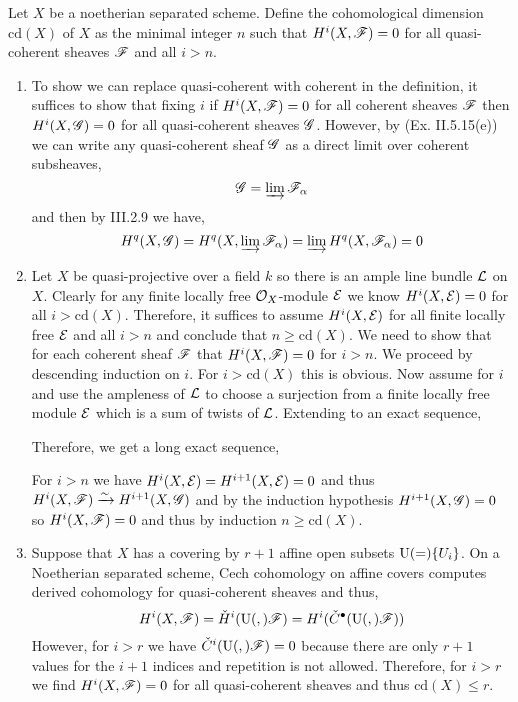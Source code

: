 \documentclass[12pt]{article}
\begin{document}
\newcommand{\cd}[1]{\mathrm{cd}\left( #1 \right)}

Let $X$ be a noetherian separated scheme. Define the cohomological dimension $\cd{X}$ of $X$ as the minimal integer $n$ such that $H^i(X, \mathscr{F}) = 0$ for all quasi-coherent sheaves $\mathscr{F}$ and all $i  > n$. 

\begin{enumerate}
\item To show we can replace quasi-coherent with coherent in the definition, it suffices to show that fixing $i$ if $H^i(X, \mathscr{F}) = 0$ for all coherent sheaves $\mathscr{F}$ then $H^i(X, \mathscr{G}) = 0$ for all quasi-coherent sheaves $\mathscr{G}$. However, by (Ex. II.5.15(e)) we can write any quasi-coherent sheaf $\mathscr{G}$ as a direct limit over coherent subsheaves,
\[ \mathscr{G} = \varinjlim \mathscr{F}_\alpha \]
and then by III.2.9 we have,
\[ H^q(X, \mathscr{G}) = H^q(X, \varinjlim \mathscr{F}_\alpha) = \varinjlim H^q(X, \mathscr{F}_\alpha) = 0 \]

\item Let $X$ be quasi-projective over a field $k$ so there is an ample line bundle $\mathcal{L}$ on $X$. Clearly for any finite locally free $\mathcal{O}_{X}$-module $\mathcal{E}$ we know $H^i(X, \mathcal{E}) = 0$ for all $i > \cd{X}$. Therefore, it suffices to assume $H^i(X, \mathcal{E})$ for all finite locally free $\mathcal{E}$ and all $i > n$ and conclude that $n \ge \cd{X}$. We need to show that for each coherent sheaf $\mathscr{F}$ that $H^i(X, \mathscr{F}) = 0$ for $i > n$. We proceed by descending induction on $i$. For $i > \cd{X}$ this is obvious. Now assume for $i$ and use the ampleness of $\mathcal{L}$ to choose a surjection from a finite locally free module $\mathcal{E}$ which is a sum of twists of $\mathcal{L}$. Extending to an exact sequence,
\begin{center}
\end{center}
Therefore, we get a long exact sequence,
\begin{center}
\end{center}
For $i > n$ we have $H^i(X, \mathcal{E}) = H^{i+1}(X, \mathcal{E}) = 0$ and thus $H^i(X, \mathscr{F}) \xrightarrow{\sim} H^{i+1}(X, \mathscr{G})$ and by the induction hypothesis $H^{i+1}(X, \mathscr{G}) = 0$ so $H^i(X, \mathscr{F}) = 0$ and thus by induction $n \ge \cd{X}$.
 
\item Suppose that $X$ has a covering by $r+1$ affine open subsets $\mathrm{U}(=) \{ U_i \}$. On a Noetherian separated scheme, Cech cohomology on affine covers computes derived cohomology for quasi-coherent sheaves and thus,
\[ H^i(X, \mathscr{F}) = \check{H}^i(\mathrm{U}(,) \mathscr{F}) = H^i(\check{C}^\bullet(\mathrm{U}(,) \mathscr{F})) \]
However, for $i > r$ we have $\check{C}^i(\mathrm{U}(,) \mathscr{F}) = 0$ because there are only $r+1$ values for the $i+1$ indices and repetition is not allowed. Therefore, for $i > r$ we find $H^i(X, \mathscr{F}) = 0$ for all quasi-coherent sheaves and thus $\cd{X} \le r$.


\end{enumerate}
\end{document}
